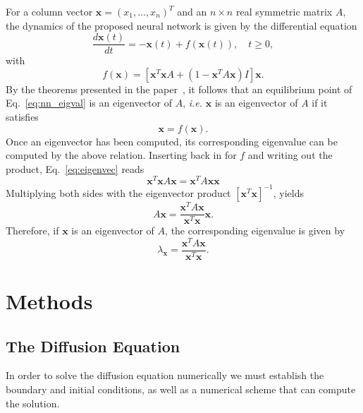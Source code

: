 \documentclass[a4paper, 
amsfonts, 
amssymb, 
amsmath, 
reprint, 
showkeys, 
nofootinbib, 
twoside]{revtex4-2}
\begin{document}
For a column vector $\mathbf{x} = (x_1, ... , x_n)^T$ and an $n \times n$ real symmetric matrix $A$, the dynamics of the proposed neural network is given by the differential equation
\begin{equation}
    \frac{d\mathbf{x}(t)}{dt} = -\mathbf{x}(t) + f\left(\mathbf{x}(t)\right), \quad t \geq 0,
    \label{eq:nn_eigval}
\end{equation}
with 
\begin{equation}
    f(\mathbf{x}) = [\mathbf{x}^T\mathbf{x}A + (1 - \mathbf{x}^TA\mathbf{x})I]\mathbf{x}.
    \label{eq:f_x}
\end{equation}
By the theorems presented in the paper~\cite{YI20041155}, it follows that an equilibrium point of Eq.~\eqref{eq:nn_eigval} is an eigenvector of $A$, \textit{i.e.} $\mathbf{x}$ is an eigenvector of $A$ if it satisfies
\begin{equation}
    \mathbf{x} = f(\mathbf{x}).
    \label{eq:eigenvec}
\end{equation}
Once an eigenvector has been computed, its corresponding eigenvalue can be computed by the above relation. Inserting back in for $f$ and writing out the product, Eq.~\eqref{eq:eigenvec} reads
\begin{equation}
    \mathbf{x}^T\mathbf{x}A\mathbf{x} = \mathbf{x}^TA\mathbf{x}\mathbf{x}
\end{equation}
Multiplying both sides with the eigenvector product $[\mathbf{x}^T\mathbf{x}]^{-1}$, yields
\begin{equation}
    A \mathbf{x} = \frac{\mathbf{x}^T A \mathbf{x}}{\mathbf{x}^T \mathbf{x}} \mathbf{x}.
\end{equation}
Therefore, if $\mathbf{x}$ is an eigenvector of $A$, the corresponding eigenvalue is given by
\begin{equation}
    \lambda_{\mathbf{x}} = \frac{\mathbf{x}^T A \mathbf{x}}{\mathbf{x}^T \mathbf{x}}. 
\end{equation}

\section{Methods}

\subsection{The Diffusion Equation}
In order to solve the diffusion equation numerically we must establish the boundary and initial conditions, as well as a numerical scheme that can compute the solution.
\end{document}
